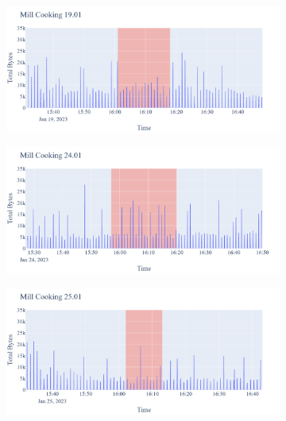 \begin{figure}[H]
\begin{subfigure}[b]{0.5\textwidth}
    \end{subfigure}
    \begin{subfigure}[b]{0.5\textwidth}
        \centering
        \includegraphics[width=1.2\hsize]{figures/Mill_Cooking_Bytes_19.01.png}
    \end{subfigure}
    \begin{subfigure}[b]{0.5\textwidth}
        \centering
        \includegraphics[width=1.2\hsize]{figures/Mill_Cooking_Bytes_24.01.png}
    \end{subfigure}
    \begin{subfigure}[b]{0.5\textwidth}
        \centering
        \includegraphics[width=1.2\hsize]{figures/Mill_Cooking_Bytes_25.01.png}
    \end{subfigure}
    \begin{subfigure}[b]{0.5\textwidth}

\end{subfigure}
\end{figure}
